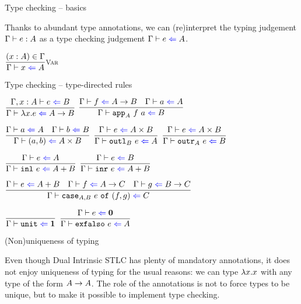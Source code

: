 \documentclass{beamer}
\begin{document}
\begin{frame}{Type checking -- basics}

Thanks to abundant type annotations, we can (re)interpret the typing judgement $\Gamma \vdash e : A$ as a type checking judgement $\fullcheck{\Gamma}{e}{A}$.

\vspace{2em}

\begin{center}
  $\infrule[Var]{\sidecond{(x : A) \in \Gamma}}{\check{x}{A}}$
\end{center}

\end{frame}

\begin{frame}{Type checking -- type-directed rules}

\begin{center}
  $\infrule{\fullcheck{\extend{\Gamma}{x}{A}}{e}{B}}{\check{\fun{x}{e}}{\Fun{A}{B}}}$ \enspace
  $\infrule{\check{f}{\Fun{A}{B}} \quad \check{a}{A}}{\check{\iapp{A}{f}{a}}{B}}$

  \vspace{2em}

  $\infrule{\check{a}{A} \quad \check{b}{B}}{\check{\pair{a}{b}}{\Prod{A}{B}}}$ \enspace
  $\infrule{\check{e}{\Prod{A}{B}}}{\check{\ioutl{B}{e}}{A}}$ \enspace
  $\infrule{\check{e}{\Prod{A}{B}}}{\check{\ioutr{A}{e}}{B}}$

  \vspace{2em}

  $\infrule{\check{e}{A}}{\check{\inl{e}}{\Sum{A}{B}}}$ \quad
  $\infrule{\check{e}{B}}{\check{\inr{e}}{\Sum{A}{B}}}$

  \vspace{2em}

  $\infrule{\check{e}{\Sum{A}{B}} \quad \check{f}{\Fun{A}{C}} \quad \check{g}{\Fun{B}{C}}}{\check{\icase{A}{B}{e}{f}{g}}{C}}$

  \vspace{2em}

  $\infrule{}{\check{\unit}{\Unit}}$ \quad
  $\infrule{\check{e}{\Empty}}{\check{\exfalso{e}}{A}}$
\end{center}

\end{frame}

\begin{frame}{(Non)uniqueness of typing}

Even though Dual Intrinsic STLC has plenty of mandatory annotations, it does not enjoy uniqueness of typing for the usual reasons: we can type $\lambda x. x$ with any type of the form $A \to A$. The role of the annotations is not to force types to be unique, but to make it possible to implement type checking.

\end{frame}
\end{document}
